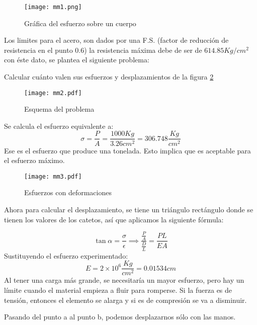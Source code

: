 \begin{figure}[h!]
\centering
  \texttt{[image: mm1.png]}
  \caption{Gráfica del esfuerzo sobre un cuerpo}
  \label{mm1}
\end{figure}

Los limites para el acero, son dados por una F.S. (factor de reducción de resistencia en el punto 0.6) la resistencia máxima debe de ser de $614.85 Kg/cm^2$
con éste dato, se plantea el siguiente problema:

\begin{problem}[Resorte]
    Calcular cuánto valen sus esfuerzos y desplazamientos de la figura \ref{mm2}
\end{problem}

\begin{figure}[h!]
\centering
  \texttt{[image: mm2.pdf]}
  \caption{Esquema del problema}
  \label{mm2}
\end{figure}

Se calcula el esfuerzo equivalente a:
\begin{equation*}
    \sigma = \frac{P}{A} = \frac{1000Kg}{3.26cm^2} = 306.748\frac{Kg}{cm^2}
\end{equation*}
Ese es el esfuerzo que produce una tonelada. Esto implica que es aceptable para el esfuerzo máximo.
\begin{figure}[h!]
\centering
  \texttt{[image: mm3.pdf]}
  \caption{Esfuerzos con deformaciones}
  \label{mm3}
\end{figure}

Ahora para calcular el desplazamiento, se tiene un triángulo rectángulo donde se tienen los valores de los catetos, así que aplicamos la siguiente fórmula:

\begin{equation}
    \tan{\alpha} =\frac{\sigma}{\epsilon}\implies \frac{\frac{P}{A}}{\frac{D}{L}} = \frac{PL}{EA} 
\end{equation}
Sustituyendo el esfuerzo experimentado:
\begin{equation*}
    E = 2 \times 10^{6}\frac{Kg}{cm^2} = 0.01534cm
\end{equation*}
Al tener una carga más grande, se necesitaría un mayor esfuerzo, pero hay un límite cuando el material empieza a fluir para romperse.
Si la fuerza es de tensión, entonces el elemento se alarga y si es de compresión se va a disminuir.

\begin{problem}
    Pasando del punto a al punto b, podemos desplazarnos sólo con las manos.
\end{problem}

